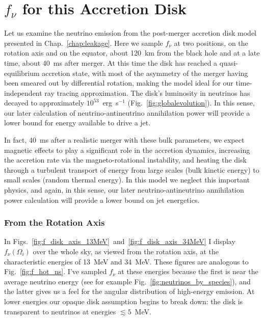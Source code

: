 \section{$f_\nu$ for this Accretion Disk}
\label{sec:f_this_case}

Let us examine the neutrino emission from the post-merger accretion disk model
presented in Chap.~\ref{chap:leakage}. Here we sample $f_\nu$ at two positions,
on the rotation axis and on the equator, about 120~km from the black hole
and at a late time, about 40~ms after merger. At this time the disk has reached
a quasi-equilibrium accretion state, with most of the asymmetry of the merger
having been smeared out by differential rotation, making the model ideal for our
time-independent ray tracing approximation. The disk's luminosity in neutrinos
has decayed to approximately $10^{53}$~erg~s$^{-1}$
(Fig.~\ref{fig:globalevolution}). In this sense, our later calculation of
neutrino-antineutrino annihilation power will provide a lower bound for energy
available to drive a jet.

In fact, 40~ms after a realistic merger with these bulk parameters, we expect
magnetic effects to play a significant role in the accretion dynamics,
increasing the accretion rate via the magneto-rotational instability, and heating
the disk through a turbulent transport of energy from large scales (bulk kinetic
energy) to small scales (random thermal energy). In this model we neglect this
important physics, and again, in this sense, our later neutrino-antineutrino
annihilation power calculation will provide a lower bound on jet energetics.

\subsubsection{From the Rotation Axis}
\label{sssc:f_this_case_A}

In Figs.~\ref{fig:f_disk_axis_13MeV}~and~\ref{fig:f_disk_axis_34MeV} I display
$f_\nu(\Omega_i)$ over the whole sky, as viewed from the rotation axis, at the
characteristic energies of 13~MeV and 34~MeV. These figures are analogous to
Fig.~\ref{fig:f_hot_ns}. I've sampled $f_\nu$ at these energies because the first is
near the average neutrino energy (see for example
Fig.~\ref{fig:neutrinos_by_species}), and the latter gives us a feel for the
angular distribution of high-energy emission. At lower energies our opaque
disk assumption begins to break down: the disk is transparent to neutrinos at
energies $\lesssim5$~MeV.

